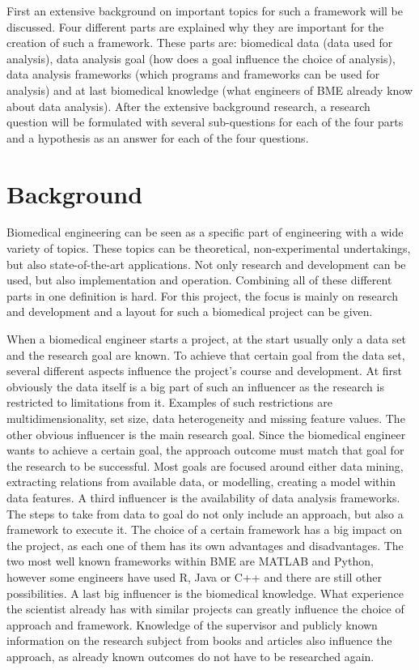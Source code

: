 \documentclass[10pt,a4paper]{article}
\begin{document}
	First an extensive background on important topics for such a framework will be discussed. Four different parts are explained why they are important for the creation of such a framework. These parts are: biomedical data (data used for analysis), data analysis goal (how does a goal influence the choice of analysis), data analysis frameworks (which programs and frameworks can be used for analysis) and at last biomedical knowledge (what engineers of BME already know about data analysis). After the extensive background research, a research question will be formulated with several sub-questions for each of the four parts and a hypothesis as an answer for each of the four questions.
	
	\section{Background}
	
	Biomedical engineering can be seen as a specific part of engineering with a wide variety of topics. These topics can be theoretical, non-experimental undertakings, but also state-of-the-art applications. Not only research and development can be used, but also implementation and operation. Combining all of these different parts in one definition is hard. \cite{bronzino2014biomedical} For this project, the focus is mainly on research and development and a layout for such a biomedical project can be given.
	
	When a biomedical engineer starts a project, at the start usually only a data set and the research goal are known. To achieve that certain goal from the data set, several different aspects influence the project's course and development. At first obviously the data itself is a big part of such an influencer as the research is restricted to limitations from it. Examples of such restrictions are multidimensionality, set size, data heterogeneity and missing feature values. The other obvious influencer is the main research goal. Since the biomedical engineer wants to achieve a certain goal, the approach outcome must match that goal for the research to be successful. Most goals are focused around either data mining, extracting relations from available data, or modelling, creating a model within data features. A third influencer is the availability of data analysis frameworks. The steps to take from data to goal do not only include an approach, but also a framework to execute it. The choice of a certain framework has a big impact on the project, as each one of them has its own advantages and disadvantages. The two most well known frameworks within BME are MATLAB and Python, however some engineers have used R, Java or C++ and there are still other possibilities. A last big influencer is the biomedical knowledge. What experience the scientist already has with similar projects can greatly influence the choice of approach and framework. Knowledge of the supervisor and publicly known information on the research subject from books and articles also influence the approach, as already known outcomes do not have to be researched again. 
	
\end{document}
